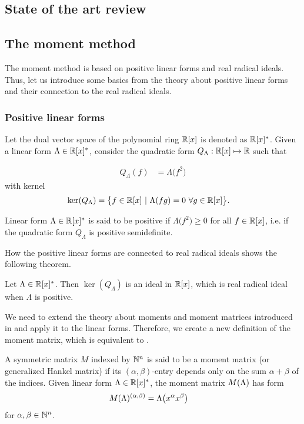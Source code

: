 \subsection{State of the art review}

\subsection{The moment method}
The moment method is based on positive linear forms and real radical ideals.
Thus, let us introduce some basics from the theory about positive linear forms and their connection to the real radical ideals.

\subsubsection{Positive linear forms}
Let the dual vector space of the polynomial ring $\mathbb{R}[x]$ is denoted as $\mathbb{R}[x]^*$.
Given a linear form $\Lambda\in\mathbb{R}[x]^*$, consider the quadratic form $Q_\Lambda : \mathbb{R}[x]\mapsto\mathbb{R}$ such that

\begin{align}
  Q_\Lambda(f) &= \Lambda\big(f^2\big)
\end{align}
with kernel
\begin{align}
  \operatorname{ker}(Q_\Lambda) &= \big\{f\in\mathbb{R}[x]\ |\ \Lambda(fg)=0\ \forall g\in\mathbb{R}[x]\big\}.
\end{align}

\begin{definition}[Positivity]
  Linear form $\Lambda\in\mathbb{R}[x]^*$ is said to be positive if $\Lambda\big(f^2\big) \geq 0$ for all $f\in\mathbb{R}[x]$, i.e. if the quadratic form $Q_\Lambda$ is positive semidefinite.
\end{definition}

How the positive linear forms are connected to real radical ideals shows the following theorem.

\begin{theorem}
  Let $\Lambda\in\mathbb{R}[x]^*$. Then $\ker(Q_\Lambda)$ is an ideal in $\mathbb{R}[x]$, which is real radical ideal when $\Lambda$ is positive.
\end{theorem}

We need to extend the theory about moments and moment matrices introduced in  and apply it to the linear forms.
Therefore, we create a new definition of the moment matrix, which is equivalent to .

\begin{definition}
  A symmetric matrix $M$ indexed by $\mathbb{N}^n$ is said to be a moment matrix (or generalized Hankel matrix) if its $(\alpha, \beta)$-entry depends only on the sum $\alpha + \beta$ of the indices.
  Given linear form $\Lambda\in\mathbb{R}[x]^*$, the moment matrix $M(\Lambda)$ has form
  \begin{align}
    M(\Lambda)^{(\alpha, \beta)} &= \Lambda\big(x^\alpha x^\beta\big)
  \end{align}
  for $\alpha, \beta \in\mathbb{N}^n$.
\end{definition}

